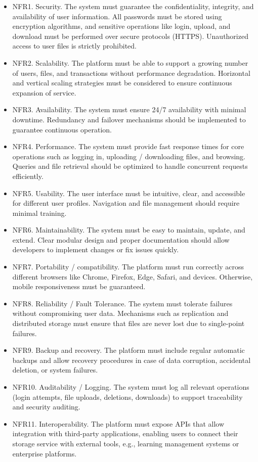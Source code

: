 \begin{itemize}
    \item NFR1. Security. The system must guarantee the confidentiality, integrity, and availability of user information. All passwords must be stored using encryption algorithms, and sensitive operations like login, upload, and download must be performed over secure protocols (HTTPS). Unauthorized access to user files is strictly prohibited.
    \item NFR2. Scalability.
    The platform must be able to support a growing number of users, files, and transactions without performance degradation. Horizontal and vertical scaling strategies must be considered to ensure continuous expansion of service.
    \item NFR3. Availability.
    The system must ensure 24/7 availability with minimal downtime. Redundancy and failover mechanisms should be implemented to guarantee continuous operation.
    \item NFR4. Performance.
    The system must provide fast response times for core operations such as logging in, uploading / downloading files, and browsing. Queries and file retrieval should be optimized to handle concurrent requests efficiently.
    \item NFR5. Usability.
    The user interface must be intuitive, clear, and accessible for different user profiles. Navigation and file management should require minimal training.
    \item NFR6. Maintainability.
    The system must be easy to maintain, update, and extend. Clear modular design and proper documentation should allow developers to implement changes or fix issues quickly.
    \item NFR7. Portability / compatibility.
    The platform must run correctly across different browsers like Chrome, Firefox, Edge, Safari, and devices. Otherwise, mobile responsiveness must be guaranteed.
    \item NFR8. Reliability / Fault Tolerance.
    The system must tolerate failures without compromising user data. Mechanisms such as replication and distributed storage must ensure that files are never lost due to single-point failures.
    \item NFR9. Backup and recovery.
    The platform must include regular automatic backups and allow recovery procedures in case of data corruption, accidental deletion, or system failures.
    \item NFR10. Auditability / Logging.
    The system must log all relevant operations (login attempts, file uploads, deletions, downloads) to support traceability and security auditing.
    \item NFR11. Interoperability.
    The platform must expose APIs that allow integration with third-party applications, enabling users to connect their storage service with external tools, e.g., learning management systems or enterprise platforms.
\end{itemize}
